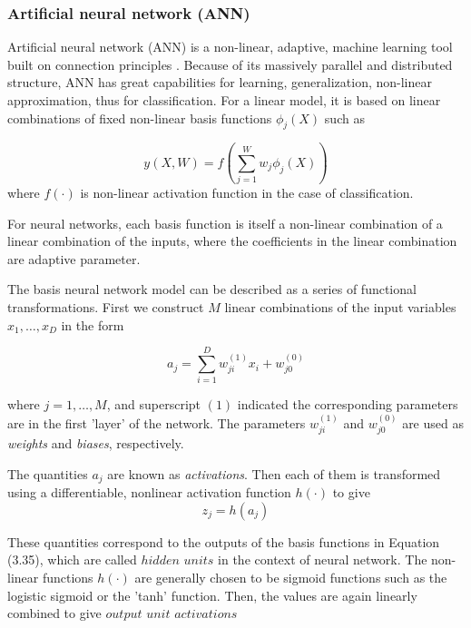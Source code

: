 \subsubsection{Artificial neural network (ANN)}
Artificial neural network (ANN) is a non-linear, adaptive, machine learning tool built on connection principles \citep{lek1999artificial, samarasinghe2006neural}. Because of its massively parallel and distributed structure, ANN has great capabilities for learning, generalization, non-linear approximation, thus for classification. For a linear model, it is based on linear combinations of fixed non-linear basis functions $\phi_{j}(X)$ such as

\begin{equation}
y(X,W)=f(\sum_{j=1}^{W}w_{j} \phi_{j}(X))
\end{equation}
where $f(\cdot)$ is non-linear activation function in the case of classification.

For neural networks, each basis function is itself a non-linear combination of a linear combination of the inputs, where the coefficients in the linear combination are adaptive parameter.

The basis neural network model can be described as a series of functional transformations. First we construct $M$ linear combinations of the input variables $x_{1},\ldots , x_{D}$ in the form


\begin{equation}
a_{j}=\sum_{i=1}^{D}w_{ji}^{(1)}x_{i}+w_{j0}^{(0)}
\end{equation}

where $j=1, \ldots ,M$, and superscript $(1)$ indicated the corresponding parameters are in the first 'layer' of the network. The parameters $w_{ji}^{(1)}$ and $w_{j0}^{(0)}$ are used as \textit{weights} and \textit{biases}, respectively. 

The quantities $a_{j}$ are known as \textit{activations}. Then each of them is transformed using a differentiable, nonlinear activation function $h(\cdot)$ to give
\begin{equation}
z_{j}=h(a_{j})
\end{equation}

These quantities correspond to the outputs of the basis functions in Equation (3.35), which are called $hidden$ $units$ in the context of neural network.
The non-linear functions $h(\cdot)$ are generally chosen to be sigmoid functions such as the logistic sigmoid or the 'tanh' function. Then, the values are again linearly combined to give $output$ $unit$ $activations$

